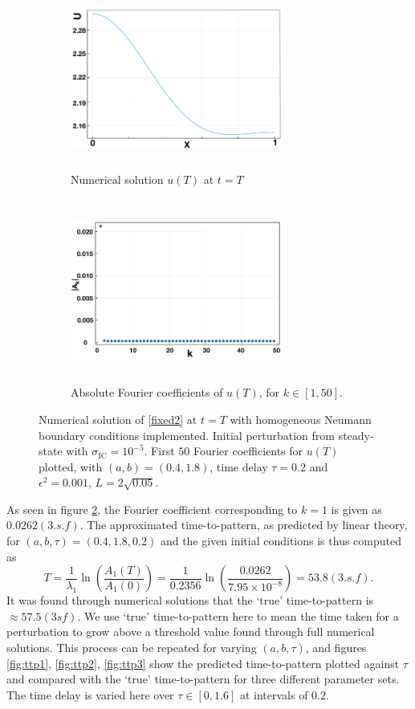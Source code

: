 \begin{figure}[H]
    \centering
    \begin{subfigure}[b]{0.45\textwidth}
        \centering
        \includegraphics[width=7cm,height=6cm]{Tu.png}
        \caption{Numerical solution $u(T)$ at $t=T$}
        \label{uT}
    \end{subfigure}
    \hfill
    \begin{subfigure}[b]{0.45\textwidth}
        \centering
        \includegraphics[width=7cm,height=6cm]{FCs.png}
        \caption{Absolute Fourier coefficients of $u(T)$, for $k\in[1,50]$.}
        \label{fig:uTfc}
    \end{subfigure}
    \caption{Numerical solution of \eqref{fixed2} at $t=T$ with homogeneous Neumann boundary conditions implemented. Initial perturbation from steady-state with $\sigma_{\text{IC}}=10^{-5}$. First $50$ Fourier coefficients for $u(T)$ plotted, with $(a,b)=(0.4,1.8)$, time delay $\tau=0.2$ and $\epsilon^2=0.001$, $L=2\sqrt{0.05}$.}
    \label{fig:Tfc}
\end{figure}
As seen in figure \ref{fig:uTfc}, the Fourier coefficient corresponding to $k=1$ is given as $0.0262(3.s.f)$. The approximated time-to-pattern, as predicted by linear theory, for $(a,b,\tau)=(0.4,1.8,0.2)$ and the given initial conditions is thus computed as
\begin{equation}
    T=\frac{1}{\lambda_1}\ln\left(\frac{A_1(T)}{A_1(0)}\right)=\frac{1}{0.2356}\ln\left(\frac{0.0262}{7.95\times10^{-8}}\right)=53.8(3.s.f).
\end{equation}
It was found through numerical solutions that the `true' time-to-pattern is $\approx57.5(3sf)$.
We use `true' time-to-pattern here to mean the time taken for a perturbation to grow above a threshold value found through full numerical solutions. This process can be repeated for varying $(a,b,\tau)$, and figures \ref{fig:ttp1}, \ref{fig:ttp2}, \ref{fig:ttp3} show the predicted time-to-pattern plotted against $\tau$ and compared with the `true' time-to-pattern for three different parameter sets. The time delay is varied here over $\tau\in[0,1.6]$ at intervals of $0.2$.

